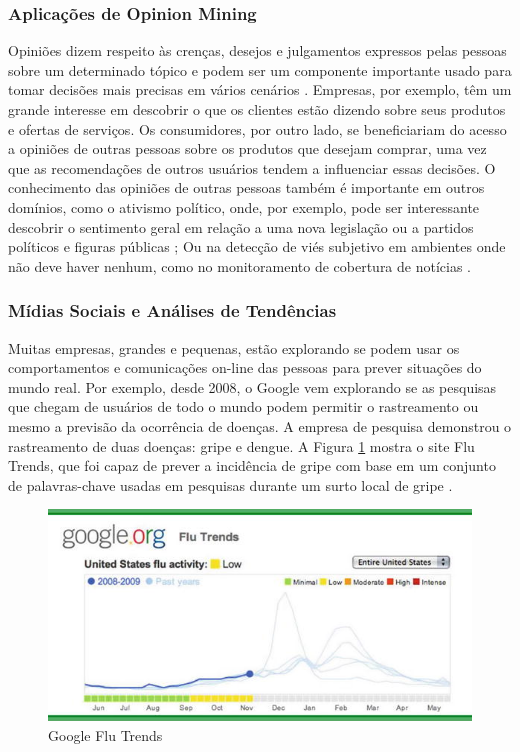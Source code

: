 \documentclass[
	12pt,				%
	openright,			%
	oneside,			%
	a4paper,			%
	english,			%
	spanish,			%
	brazil				%
	]{abntex2}
\begin{document}
	\subsubsection*{Aplicações de Opinion Mining}
	
	Opiniões dizem respeito às crenças, desejos e julgamentos expressos pelas pessoas sobre um determinado tópico e podem ser um componente importante usado para tomar decisões mais precisas em vários cenários \cite{book_discover_practices}. Empresas, por exemplo, têm um grande interesse em descobrir o que os clientes estão dizendo sobre seus produtos e ofertas de serviços. Os consumidores, por outro lado, se beneficiariam do acesso a opiniões de outras pessoas sobre os produtos que desejam comprar, uma vez que as recomendações de outros usuários tendem a influenciar essas decisões. O conhecimento das opiniões de outras pessoas também é importante em outros domínios, como o ativismo político, onde, por exemplo, pode ser interessante descobrir o sentimento geral em relação a uma nova legislação ou a partidos políticos e figuras públicas \cite{book_political_opinion}; Ou na detecção de viés subjetivo em ambientes onde não deve haver nenhum, como no monitoramento de cobertura de notícias \cite{book_Cambria2015}.

	\subsubsection*{Mídias Sociais e Análises de Tendências}
	Muitas empresas, grandes e pequenas, estão explorando se podem usar os comportamentos e comunicações on-line das pessoas para prever situações do mundo real. Por exemplo, desde 2008, o Google vem explorando se as pesquisas que chegam de usuários de todo o mundo podem permitir o rastreamento ou mesmo a previsão da ocorrência de doenças. A empresa de pesquisa demonstrou o rastreamento de duas doenças: gripe e dengue. A Figura \ref{google_flu} mostra o site Flu Trends, que foi capaz de prever a incidência de gripe com base em um conjunto de palavras-chave usadas em pesquisas durante um surto local de gripe \cite{book_social_machines}.

\begin{figure}[!h]
\centering
\includegraphics{google_flu}
\caption{Google Flu Trends}
\label{google_flu}
\end{figure}
\end{document}
